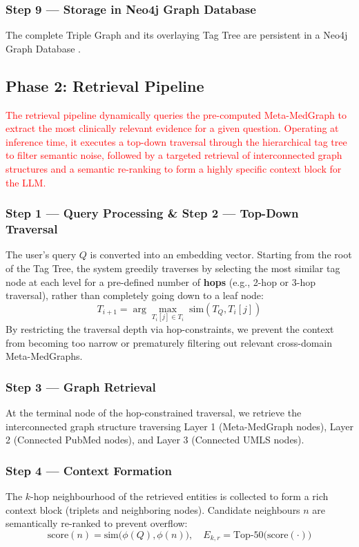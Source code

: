 \documentclass[a4paper,fleqn]{cas-sc}
\begin{document}
\subsubsection{Step 9 --- Storage in Neo4j Graph Database}
The complete Triple Graph and its overlaying Tag Tree are persistent in a Neo4j Graph Database \cite{neo4j}.

\subsection{Phase 2: Retrieval Pipeline}
\textcolor{red}{The retrieval pipeline dynamically queries the pre-computed Meta-MedGraph to extract the most clinically relevant evidence for a given question. Operating at inference time, it executes a top-down traversal through the hierarchical tag tree to filter semantic noise, followed by a targeted retrieval of interconnected graph structures and a semantic re-ranking to form a highly specific context block for the LLM.}
\subsubsection{Step 1 --- Query Processing \& Step 2 --- Top-Down Traversal}
The user's query $Q$ is converted into an embedding vector. Starting from the root of the Tag Tree, the system greedily traverses by selecting the most similar tag node at each level for a pre-defined number of \textbf{hops} (e.g., 2-hop or 3-hop traversal), rather than completely going down to a leaf node:
\begin{equation}
T_{i+1} = \arg\max_{T_i[j] \in T_i}\;\text{sim}(T_Q, T_i[j])
\end{equation}
By restricting the traversal depth via hop-constraints, we prevent the context from becoming too narrow or prematurely filtering out relevant cross-domain Meta-MedGraphs.

\subsubsection{Step 3 --- Graph Retrieval}
At the terminal node of the hop-constrained traversal, we retrieve the interconnected graph structure traversing Layer 1 (Meta-MedGraph nodes), Layer 2 (Connected PubMed nodes), and Layer 3 (Connected UMLS nodes).

\subsubsection{Step 4 --- Context Formation}
The $k$-hop neighbourhood of the retrieved entities is collected to form a rich context block (triplets and neighboring nodes). Candidate neighbours $n$ are semantically re-ranked to prevent overflow:
\begin{equation}
\text{score}(n) = \text{sim}\bigl(\phi(Q), \phi(n)\bigr), \quad E_{k,r} = \text{Top-}50\bigl(\text{score}(\cdot)\bigr)
\end{equation}
\end{document}
